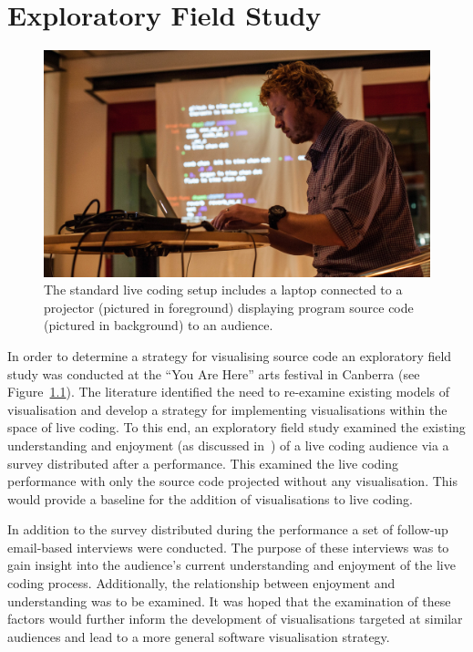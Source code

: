 
\chapter{Exploratory Field Study}
\label{chap:exploratory-field-study}

\begin{figure}
\centering
\includegraphics[width=1.0\textwidth]{../images/study-1-you-are-here-ben.jpg}
\caption[Standard live coding setup]{The standard live coding setup includes a laptop connected to a projector (pictured in foreground) displaying program source code (pictured in background) to an audience.}
\label{fig:exploratory-field-study-ben}
\end{figure}


In order to determine a strategy for visualising source code an exploratory field study was conducted at the ``You Are Here'' arts festival in Canberra (see Figure~\ref{fig:exploratory-field-study-ben}). The literature identified the need to re-examine existing models of visualisation and develop a strategy for implementing visualisations within the space of live coding. To this end, an exploratory field study examined the existing understanding and enjoyment (as discussed in~\cite{McLean2010a}) of a live coding audience via a survey distributed after a performance. This examined the live coding performance with only the source code projected without any visualisation. This would provide a baseline for the addition of visualisations to live coding.

In addition to the survey distributed during the performance a set of follow-up email-based interviews were conducted. The purpose of these interviews was to gain insight into the audience's current understanding and enjoyment of the live coding process. Additionally, the relationship between enjoyment and understanding was to be examined. It was hoped that the examination of these factors would further inform the development of visualisations targeted at similar audiences and lead to a more general software visualisation strategy.


